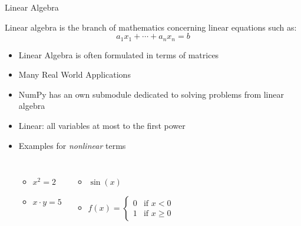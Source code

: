 
\begin{frame}{Linear Algebra}
%
\vspace{-6pt}
\begin{tcolorbox}[title=Wikipedia]
\scriptsize
Linear algebra is the branch of mathematics concerning linear equations such as:
\[ a_{1} x_{1} + \cdots + a_{n} x_{n} = b \]
\end{tcolorbox}
%
\begin{itemize}
\item Linear Algebra is often formulated in terms of matrices
\item Many Real World Applications
\item NumPy has an own submodule dedicated to solving problems from linear algebra
\item Linear: all variables at most to the first power
\item Examples for \emph{nonlinear} terms
	\vspace{-6pt}
	\begin{columns}
	\vspace{-6pt}
	\begin{itemize}
	\item $x^2 = 2$
	\item $x \cdot y = 5$
	\end{itemize}
	\begin{itemize}
	\item $\sin(x)$
	\item $f(x) = \begin{cases}
		0 & \text{if } x < 0 \\
		1 & \text{if } x \geq 0
	\end{cases}$
	\end{itemize}
	\end{columns}
\end{itemize}
%
\end{frame}



